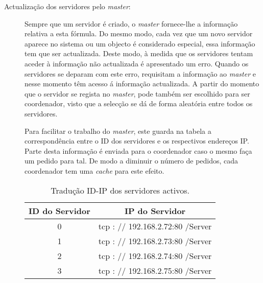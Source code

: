 \begin{description}
\item[Actualização dos servidores pelo \textit{master}:]
Sempre que um servidor é criado, o \textit{master} fornece-lhe a informação relativa a esta fórmula. Do mesmo modo, cada vez que um novo servidor aparece no sistema ou um objecto é considerado especial, essa informação tem que ser actualizada. Deste modo, à medida que os servidores tentam aceder à informação não actualizada é apresentado um erro. Quando os servidores se deparam com este erro, requisitam a informação ao \textit{master} e nesse momento têm acesso á informação actualizada.  A partir do momento que o servidor se regista no \textit{master},  pode também ser escolhido para ser coordenador, visto que a selecção se dá de forma aleatória entre todos os servidores.

Para facilitar o trabalho do \textit{master}, este guarda na tabela a correspondência entre o ID dos servidores e os respectivos endereços IP. Parte desta informação é enviada para o coordenador caso o mesmo faça um pedido para tal. De modo a diminuir o número de pedidos, cada coordenador tem uma \textit{cache} para este efeito.

\begin{table}
\centering
\begin{tabular}{c|c}
ID do Servidor & IP do Servidor \\\hline
0 & tcp : // 192.168.2.72:80 /Server \\
1 & tcp : // 192.168.2.73:80 /Server \\
2 & tcp : // 192.168.2.74:80 /Server \\
3 & tcp : // 192.168.2.75:80 /Server \\
\end{tabular}
\caption{\label{tab:idip}Tradução ID-IP dos servidores activos.}
\end{table}
\end{description}